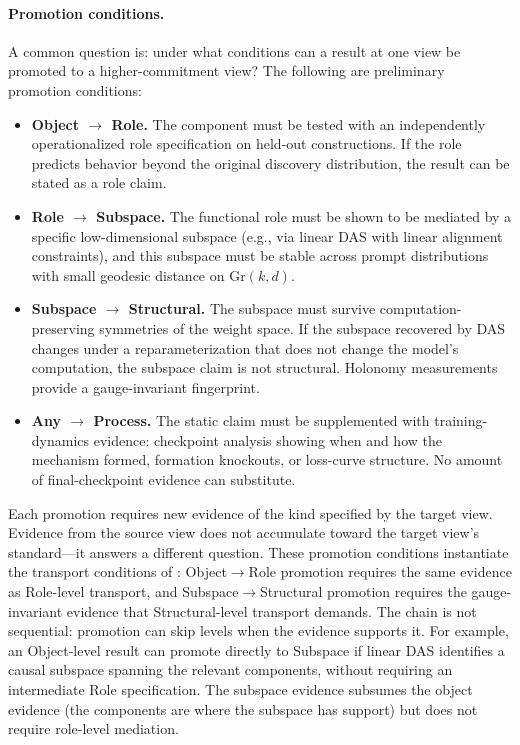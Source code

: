 \documentclass{article}
\newcommand{\Gr}{\mathrm{Gr}}
\begin{document}
\paragraph{Promotion conditions.}
A common question is: under what conditions can a result at one view be
promoted to a higher-commitment view?  The following are preliminary
promotion conditions:
\begin{itemize}[leftmargin=*]
\item \textbf{Object $\to$ Role.}  The component must be tested with an
      independently operationalized role specification on held-out
      constructions.  If the role predicts behavior beyond the original
      discovery distribution, the result can be stated as a role claim.
\item \textbf{Role $\to$ Subspace.}  The functional role must be shown to
      be mediated by a specific low-dimensional subspace (e.g., via linear
      DAS with linear alignment constraints), and this subspace must be stable
      across prompt distributions with small geodesic distance on $\Gr(k,d)$.
\item \textbf{Subspace $\to$ Structural.}  The subspace must survive
      computation-preserving symmetries of the weight space.  If the subspace
      recovered by DAS changes under a reparameterization that does not
      change the model's computation, the subspace claim is not structural.
      Holonomy measurements provide a gauge-invariant fingerprint.
\item \textbf{Any $\to$ Process.}  The static claim must be supplemented
      with training-dynamics evidence: checkpoint analysis showing when and
      how the mechanism formed, formation knockouts, or loss-curve structure.
      No amount of final-checkpoint evidence can substitute.
\end{itemize}
Each promotion requires new evidence of the kind specified by the target
view.  Evidence from the source view does not accumulate toward the
target view's standard---it answers a different question.  These promotion conditions instantiate the transport conditions of \citet{tower2026mechref}: Object$\to$Role promotion requires the same evidence as Role-level transport, and Subspace$\to$Structural promotion requires the gauge-invariant evidence that Structural-level transport demands.  The chain is
not sequential: promotion can skip levels when the evidence supports it.
For example, an Object-level result can promote directly to Subspace if
linear DAS identifies a causal subspace spanning the relevant components,
without requiring an intermediate Role specification.  The subspace
evidence subsumes the object evidence (the components are where the
subspace has support) but does not require role-level mediation.
\end{document}
